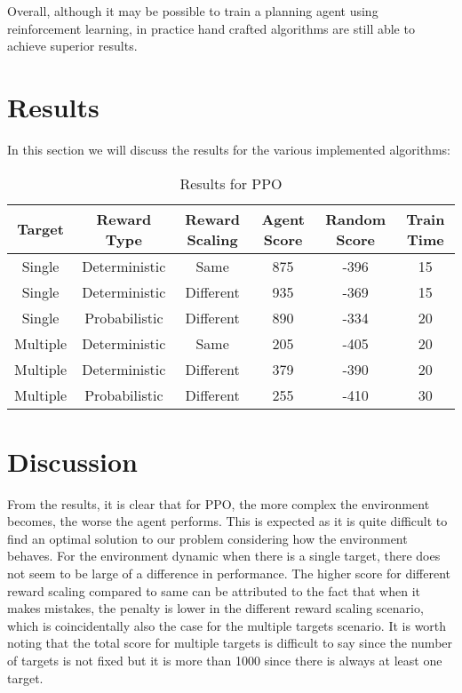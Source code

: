 \documentclass{article}
\begin{document}
Overall, although it may be possible to train a planning agent using reinforcement learning, in practice hand crafted algorithms are still able to achieve superior results.

\section{Results}
\label{results}
In this section we will discuss the results for the various implemented algorithms:

\begin{table*}[h]
	\centering
	\caption[]{Results for PPO}\label{Results for PPO}%
	\begin{tabular}{cccccc}
		\toprule
		Target & Reward Type & Reward Scaling\footnotemark[1] & Agent Score\footnotemark[2] & Random Score\footnotemark[2] & Train Time\footnotemark[3]\\
		\midrule
		Single &  Deterministic & Same & 875 & -396 & 15\\
		Single & Deterministic & Different\footnotemark[4] & 935 & -369 & 15\\
		Single & Probabilistic & Different & 890 & -334 & 20\\
		\midrule
		Multiple & Deterministic & Same & 205 & -405 & 20\\
		Multiple & Deterministic & Different & 379 & -390 & 20\\
		Multiple & Probabilistic & Different & 255 & -410 & 30\\
		\bottomrule
	\end{tabular}
	\label{tab: PPO_Table}
\end{table*}


\section{Discussion}
\label{discussion}
From the results, it is clear that for PPO, the more complex the environment becomes, the worse the agent performs. This is expected as it is quite difficult to find an optimal solution to our problem considering how the environment behaves. For the environment dynamic when there is a single target, there does not seem to be large of a difference in performance. The higher score for different reward scaling compared to same can be attributed to the fact that when it makes mistakes, the penalty is lower in the different reward scaling scenario, which is coincidentally also the case for the multiple targets scenario. It is worth noting that the total score for multiple targets is difficult to say since the number of targets is not fixed but it is more than 1000 since there is always at least one target.
\end{document}
